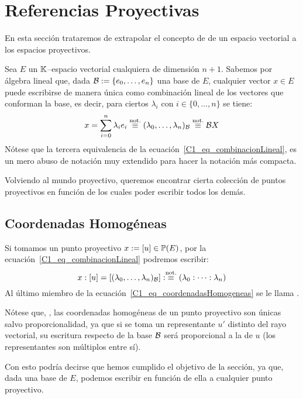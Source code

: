 \section{Referencias Proyectivas}
En esta sección trataremos de extrapolar el concepto de  de un espacio vectorial a los espacios proyectivos.

Sea $E$ un $\mathbb{K}$--espacio vectorial cualquiera de dimensión $n+1$. Sabemos por álgebra lineal que, dada $\mathcal{B}:=\{e_0,\dots,e_n\}$ una base de $E$, cualquier vector $x\in E$ puede escribirse de manera única como combinación lineal de los vectores que conforman la base, es decir, para ciertos $\lambda_i$ con $i\in\{0,\dots,n\}$ se tiene:
\begin{equation}
\label{C1_eq_combinacionLineal}
x=\sum_{i=0}^{n}\lambda_ie_i\stackrel{\textrm{not.}}{\equiv}(\lambda_0,\dots,\lambda_n)_{\mathcal{B}}\stackrel{\textrm{not.}}{\equiv}\mathcal{B}X
\end{equation}
Nótese que la tercera equivalencia de la ecuación~\eqref{C1_eq_combinacionLineal}, es un mero abuso de notación muy extendido para hacer la notación más compacta.

Volviendo al mundo proyectivo, queremos encontrar cierta colección de puntos proyectivos en función de los cuales poder escribir todos los demás. 
\subsection{Coordenadas Homogéneas}
\label{C1_coordenadasHomogeneas}
Si tomamos un punto proyectivo $x:=\left [ u \right ]\in\mathbb{P}(E)$, por la ecuación~\eqref{C1_eq_combinacionLineal} podremos escribir:
\begin{equation}
	\label{C1_eq_coordenadasHomogeneas}
	x:\left [ u \right ]=\left [ (\lambda_0,\dots,\lambda_n)_{\mathcal{B}} \right ]:\stackrel{\textrm{not.}}{\equiv}(\lambda_0:\dots:\lambda_n)
\end{equation}
Al último miembro de la ecuación~\eqref{C1_eq_coordenadasHomogeneas} se le llama .

Nótese que, , las coordenadas homogéneas de un punto proyectivo son únicas salvo proporcionalidad, ya que si se toma un representante $u'$ distinto del rayo vectorial, su escritura respecto de la base $\mathcal{B}$ será proporcional a la de $u$ (los representantes son múltiplos entre sí).

Con esto podría decirse que hemos cumplido el objetivo de la sección, ya que, dada una base de $E$, podemos escribir en función de ella a cualquier punto proyectivo.

